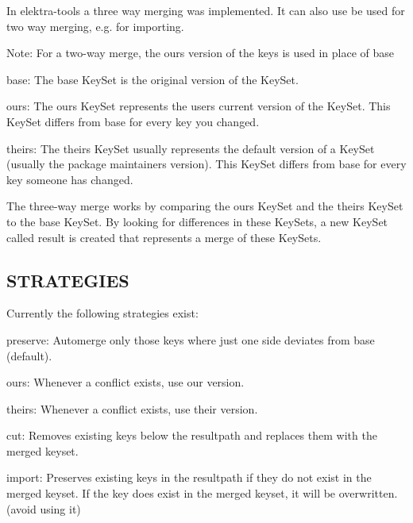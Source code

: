 In elektra-\/tools a three way merging was implemented. It can also use be used for two way merging, e.\+g. for importing.

Note\+: For a two-\/way merge, the {\ttfamily ours} version of the keys is used in place of {\ttfamily base}


\begin{DoxyItemize}
\item {\ttfamily base}\+: The {\ttfamily base} Key\+Set is the original version of the Key\+Set.
\item {\ttfamily ours}\+: The {\ttfamily ours} Key\+Set represents the user\textquotesingle{}s current version of the Key\+Set. This Key\+Set differs from {\ttfamily base} for every key you changed.
\item {\ttfamily theirs}\+: The {\ttfamily theirs} Key\+Set usually represents the default version of a Key\+Set (usually the package maintainer\textquotesingle{}s version). This Key\+Set differs from {\ttfamily base} for every key someone has changed.
\end{DoxyItemize}

The three-\/way merge works by comparing the {\ttfamily ours} Key\+Set and the {\ttfamily theirs} Key\+Set to the {\ttfamily base} Key\+Set. By looking for differences in these Key\+Sets, a new Key\+Set called {\ttfamily result} is created that represents a merge of these Key\+Sets.

\subsection*{S\+T\+R\+A\+T\+E\+G\+I\+ES}

Currently the following strategies exist\+:


\begin{DoxyItemize}
\item preserve\+: Automerge only those keys where just one side deviates from base (default).
\item ours\+: Whenever a conflict exists, use our version.
\item theirs\+: Whenever a conflict exists, use their version.
\item cut\+: Removes existing keys below the resultpath and replaces them with the merged keyset.
\item import\+: Preserves existing keys in the resultpath if they do not exist in the merged keyset. If the key does exist in the merged keyset, it will be overwritten. (avoid using it) 
\end{DoxyItemize}